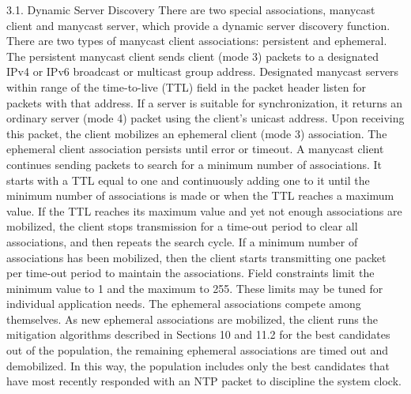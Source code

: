 3.1. Dynamic Server Discovery
 There are two special associations, manycast client and manycast
 server, which provide a dynamic server discovery function. There are
 two types of manycast client associations: persistent and ephemeral.
 The persistent manycast client sends client (mode 3) packets to a
 designated IPv4 or IPv6 broadcast or multicast group address.
 Designated manycast servers within range of the time-to-live (TTL)
 field in the packet header listen for packets with that address. If
 a server is suitable for synchronization, it returns an ordinary
 server (mode 4) packet using the client’s unicast address. Upon
 receiving this packet, the client mobilizes an ephemeral client (mode
 3) association. The ephemeral client association persists until
 error or timeout.
 A manycast client continues sending packets to search for a minimum
 number of associations. It starts with a TTL equal to one and
 continuously adding one to it until the minimum number of
 associations is made or when the TTL reaches a maximum value. If the
 TTL reaches its maximum value and yet not enough associations are
 mobilized, the client stops transmission for a time-out period to
 clear all associations, and then repeats the search cycle. If a
 minimum number of associations has been mobilized, then the client
 starts transmitting one packet per time-out period to maintain the
 associations. Field constraints limit the minimum value to 1 and the
 maximum to 255. These limits may be tuned for individual application
 needs.
 The ephemeral associations compete among themselves. As new
 ephemeral associations are mobilized, the client runs the mitigation
 algorithms described in Sections 10 and 11.2 for the best candidates
 out of the population, the remaining ephemeral associations are timed
 out and demobilized. In this way, the population includes only the
 best candidates that have most recently responded with an NTP packet
 to discipline the system clock.
